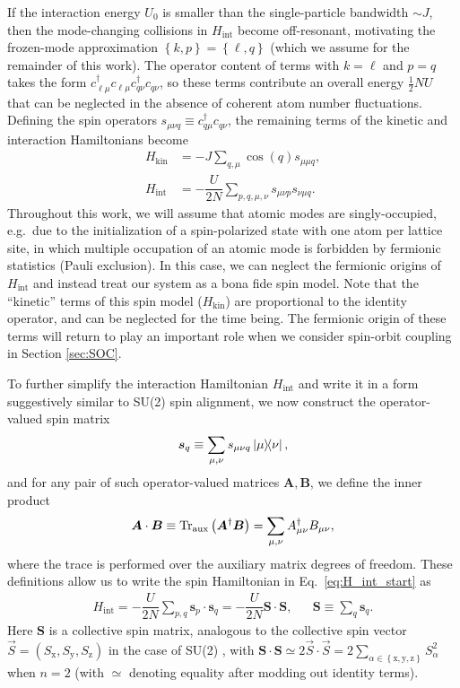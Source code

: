 \documentclass[nofootinbib,twocolumn]{revtex4-2}
\renewcommand{\t}{\text} %
\newcommand{\f}[2]{\dfrac{#1}{#2}} %
\newcommand{\p}[1]{\left(#1\right)} %
\renewcommand{\set}[1]{\left\{#1\right\}} %
\renewcommand{\v}{\bm} %
\renewcommand{\c}{\cdot} %
\newcommand{\1}{\mathds{1}}
\newcommand{\x}{\text{x}}
\newcommand{\y}{\text{y}}
\newcommand{\z}{\text{z}}
\begin{document}
If the interaction energy $U_0$ is smaller than the single-particle bandwidth $\sim J$, then the mode-changing collisions in $H_{\t{int}}$ become off-resonant, motivating the frozen-mode approximation $\set{k,p}=\set{\ell,q}$ (which we assume for the remainder of this work).
The operator content of terms with $k=\ell$ and $p=q$ takes the form $c_{\ell\mu}^\dag c_{\ell\mu} c_{q\nu}^\dag c_{q\nu}$, so these terms contribute an overall energy $\frac12NU$ that can be neglected in the absence of coherent atom number fluctuations.
Defining the spin operators $s_{\mu\nu q}\equiv c_{q\mu}^\dag c_{q\nu}$, the remaining terms of the kinetic and interaction Hamiltonians become
\begin{align}
  H_{\t{kin}} &= -J\sum_{q,\mu} \cos\p{q} s_{\mu\mu q},
  \label{H_kin_start} \\
  H_{\t{int}} &= -\f{U}{2N} \sum_{p,q,\mu,\nu} s_{\mu\nu p} s_{\nu\mu q}.
  \label{eq:H_int_start}
\end{align}
Throughout this work, we will assume that atomic modes are singly-occupied, e.g.~due to the initialization of a spin-polarized state with one atom per lattice site, in which multiple occupation of an atomic mode is forbidden by fermionic statistics (Pauli exclusion).
In this case, we can neglect the fermionic origins of $H_{\t{int}}$ and instead treat our system as a bona fide spin model.
Note that the ``kinetic'' terms of this spin model ($H_{\t{kin}}$) are proportional to the identity operator, and can be neglected for the time being.
The fermionic origin of these terms will return to play an important role when we consider spin-orbit coupling in Section \ref{sec:SOC}.

To further simplify the interaction Hamiltonian $H_{\t{int}}$ and write it in a form suggestively similar to SU(2) spin alignment, we now construct the operator-valued spin matrix
\begin{align}
  \v s_q \equiv \sum_{\mu,\nu} s_{\mu\nu q} \op{\mu}{\nu},
\end{align}
and for any pair of such operator-valued matrices $\v A,\v B$, we define the inner product
\begin{align}
  \v A \c \v B \equiv \Tr_{\t{aux}}\p{\v A^\dag\v B}
  = \sum_{\mu,\nu} A_{\mu\nu}^\dag B_{\mu\nu},
\end{align}
where the trace is performed over the auxiliary matrix degrees of freedom.
These definitions allow us to write the spin Hamiltonian in Eq.~\eqref{eq:H_int_start} as
\begin{align}
  H_{\t{int}} = -\f{U}{2N} \sum_{p,q} \v s_p\c\v s_q
  = -\f{U}{2N}\v S\c\v S,
  &&
  \v S \equiv \sum_q \v s_q.
  \label{eq:H_int}
\end{align}
Here $\v S$ is a collective spin matrix, analogous to the collective spin vector $\vec S=\p{S_\x,S_\y,S_\z}$ in the case of SU(2) \cite{he2019engineering}, with $\v S\c\v S \simeq 2 \vec S\c\vec S = 2 \sum_{\alpha\in\set{\x,\y,\z}}S_\alpha^2$ when $n=2$ (with $\simeq$ denoting equality after modding out identity terms).
\end{document}
